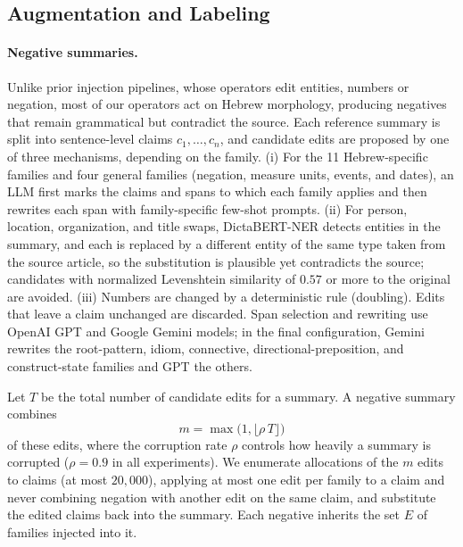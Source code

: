 \documentclass[11pt]{article}
\begin{document}
\subsection{Augmentation and Labeling}
\label{sec:augmentation}

\paragraph{Negative summaries.}
Unlike prior injection pipelines, whose operators edit entities, numbers or negation, most of our operators act on Hebrew morphology, producing negatives that remain grammatical but contradict the source. Each reference summary is split into sentence-level claims $c_1,\dots,c_n$, and candidate edits are proposed by one of three mechanisms, depending on the family. (i) For the 11 Hebrew-specific families and four general families (negation, measure units, events, and dates), an LLM first marks the claims and spans to which each family applies and then rewrites each span with family-specific few-shot prompts. (ii) For person, location, organization, and title swaps, DictaBERT-NER \citep{shmidman2023dictabert} detects entities in the summary, and each is replaced by a different entity of the same type taken from the source article, so the substitution is plausible yet contradicts the source; candidates with normalized Levenshtein similarity of $0.57$ or more to the original are avoided. (iii) Numbers are changed by a deterministic rule (doubling). Edits that leave a claim unchanged are discarded. Span selection and rewriting use OpenAI GPT and Google Gemini models; in the final configuration, Gemini rewrites the root-pattern, idiom, connective, directional-preposition, and construct-state families and GPT the others.

Let $T$ be the total number of candidate edits for a summary. A negative summary combines
\begin{equation}
  m = \max\bigl(1, \lfloor \rho\, T \rfloor\bigr)
  \label{eq:num_errors}
\end{equation}
of these edits, where the corruption rate $\rho$ controls how heavily a summary is corrupted ($\rho=0.9$ in all experiments). We enumerate allocations of the $m$ edits to claims (at most $20{,}000$), applying at most one edit per family to a claim and never combining negation with another edit on the same claim, and substitute the edited claims back into the summary. Each negative inherits the set $E$ of families injected into it.
\end{document}
